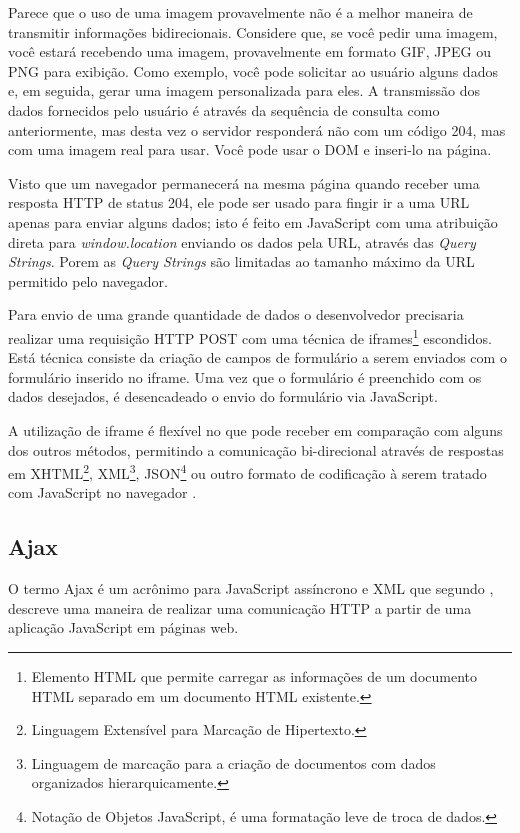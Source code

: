\begin{citacao}
	Parece que o uso de uma imagem provavelmente não é a melhor maneira de transmitir informações bidirecionais. Considere que, se você pedir uma imagem, você estará recebendo uma imagem, provavelmente em formato GIF, JPEG ou PNG para exibição. Como exemplo, você pode solicitar ao usuário alguns dados e, em seguida, gerar uma imagem personalizada para eles. A transmissão dos dados fornecidos pelo usuário é através da sequência de consulta como anteriormente, mas desta vez o servidor responderá não com um código 204, mas com uma imagem real para usar. Você pode usar o DOM e inseri-lo na página.
\end{citacao}

Visto que um navegador permanecerá na mesma página quando receber uma resposta HTTP de status 204, ele pode ser usado para fingir ir a uma URL apenas para enviar alguns dados; isto é feito em JavaScript com uma atribuição direta para \emph{window.location} enviando os dados pela URL, através das \emph{Query Strings}. Porem as \emph{Query Strings} são limitadas ao tamanho máximo da URL permitido pelo navegador.

Para envio de uma grande quantidade de dados o desenvolvedor precisaria realizar uma requisição HTTP POST com uma técnica de iframes\footnote{Elemento HTML que permite carregar as informações de um documento HTML separado em um documento HTML existente.} escondidos. Está técnica consiste da criação de campos de formulário a serem enviados com o formulário inserido no iframe. Uma vez que o formulário é preenchido com os dados desejados, é desencadeado o envio do formulário via JavaScript.

A utilização de iframe é flexível no que pode receber em comparação com alguns dos outros métodos, permitindo a comunicação bi-direcional através de respostas em XHTML\footnote{Linguagem Extensível para Marcação de Hipertexto.}, XML\footnote{Linguagem de marcação para a criação de documentos com dados organizados hierarquicamente.}, JSON\footnote{Notação de Objetos JavaScript, é uma formatação leve de troca de dados.} ou outro formato de codificação à serem tratado com JavaScript no navegador \cite{powell2008ajax}.

\subsection{Ajax}

O termo Ajax é um acrônimo para JavaScript assíncrono e XML que segundo , descreve uma maneira de realizar uma comunicação HTTP a partir de uma aplicação JavaScript em páginas web.

